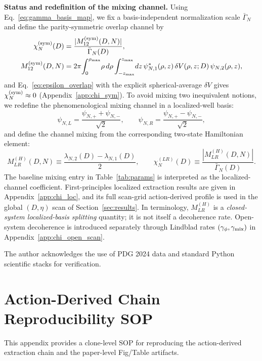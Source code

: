 \documentclass[aps,prd,onecolumn,notitlepage,nofootinbib,superscriptaddress,11pt,floatfix]{revtex4-2}
\begin{document}
\textbf{Status and redefinition of the mixing channel.}
Using Eq.~\eqref{eq:gamma_basis_map}, we fix a basis-independent normalization scale $\bar{\Gamma}_N$ and define the parity-symmetric overlap channel by
\begin{equation}
\begin{aligned}
\chi_N^{\rm(sym)}(D)&=\frac{|M_{12}^{\rm(sym)}(D,N)|}{\bar{\Gamma}_N(D)},\\
M_{12}^{\rm(sym)}(D,N)&=2\pi\!\int_0^{\rho_{\max}}\!\rho\,d\rho
\int_{-z_{\max}}^{z_{\max}}\!dz\,
\psi_{N,1}^*(\rho,z)\,\delta V(\rho,z;D)\,\psi_{N,2}(\rho,z),
\end{aligned}
\label{eq:chi_first_principles}
\end{equation}
and Eq.~\eqref{eq:epsilon_overlap} with the explicit spherical-average $\delta V$ gives $\chi_N^{\rm(sym)}\approx 0$ (Appendix~\ref{app:chi_sym}). To avoid mixing two inequivalent notions, we redefine the phenomenological mixing channel in a localized-well basis:
\begin{equation}
\psi_{N,L}=\frac{\psi_{N,+}+\psi_{N,-}}{\sqrt{2}},\qquad
\psi_{N,R}=\frac{\psi_{N,+}-\psi_{N,-}}{\sqrt{2}},
\end{equation}
and define the channel mixing from the corresponding two-state Hamiltonian element:
\begin{equation}
M_{LR}^{(H)}(D,N)\equiv\frac{\lambda_{N,2}(D)-\lambda_{N,1}(D)}{2},\qquad
\chi_N^{(LR)}(D)\equiv\frac{|M_{LR}^{(H)}(D,N)|}{\bar{\Gamma}_N(D)}.
\end{equation}
The baseline mixing entry in Table~\ref{tab:params} is interpreted as the localized-channel coefficient. First-principles localized extraction results are given in Appendix~\ref{app:chi_loc}, and its full scan-grid action-derived profile is used in the global $(D,\eta)$ scan of Section~\ref{sec:results}.
In terminology, $M_{LR}^{(H)}$ is a \emph{closed-system localized-basis splitting} quantity; it is not itself a decoherence rate. Open-system decoherence is introduced separately through Lindblad rates $(\gamma_\phi,\gamma_{\rm mix})$ in Appendix~\ref{app:chi_open_scan}.

\begin{acknowledgments}
The author acknowledges the use of PDG 2024 data and standard Python scientific stacks for verification.
\end{acknowledgments}

\appendix
\section{Action-Derived Chain Reproducibility SOP}
\label{app:repro_sop}
This appendix provides a clone-level SOP for reproducing the action-derived extraction chain and the paper-level Fig/Table artifacts.
\end{document}
